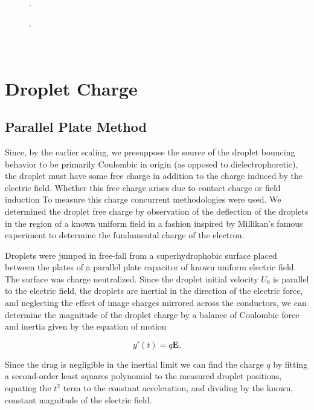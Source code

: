 \documentclass[10pt,a4paper]{article}
\begin{document}
\begin{figure}[htb]
    \centering
    
    \caption{.\label{fig:contact}}
\end{figure}

\begin{figure}[htb]
    \centering
    
    \caption{.\label{fig:restitution}}
\end{figure}

\newpage
\appendix
\section{\\Droplet Charge} \label{sec.drop_charge}
\subsection*{Parallel Plate Method}
Since, by the earlier scaling, we presuppose the source of the droplet bouncing behavior to be primarily Coulombic in origin (as opposed to dielectrophoretic), the droplet must have some free charge in addition to the charge induced by the electric field. Whether this free charge arises due to contact charge or field induction To measure this charge concurrent methodologies were used. We determined the droplet free charge by observation of the deflection of the droplets in the region of a known uniform field in a fashion inspired by Millikan's famous experiment to determine the fundamental charge of the electron.

Droplets were jumped in free-fall from a superhydrophobic surface placed between the plates of a parallel plate capacitor of known uniform electric field. The surface was charge neutralized. Since the droplet initial velocity $U_0$ is parallel to the electric field, the droplets are inertial in the direction of the electric force, and neglecting the effect of image charges mirrored across the conductors, we can determine the magnitude of the droplet charge by a balance of Coulombic force and inertia given by the equation of motion

\[ y'(t) = q\mathbf{E}. \]

Since the drag is negligible in the inertial limit we can find the charge $q$ by fitting a second-order least squares polynomial to the measured droplet positions, equating the $t^2$ term to the constant acceleration, and dividing by the known, constant magnitude of the electric field.  
\end{document}
